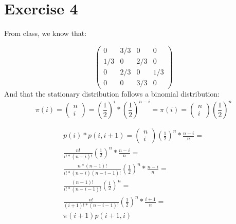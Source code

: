 \documentclass{article}\usepackage[]{graphicx}\usepackage[]{color}
\begin{document}
\section*{Exercise 4}
From class, we know that:

\begin{equation}
\left(\begin{array}{cccc}
0 & 3/3 & 0 & 0\\
1/3 & 0 & 2/3 & 0\\
0 & 2/3 & 0 & 1/3\\
0 & 0 & 3/3 & 0
\end{array}\right)
\end{equation}
And that the stationary distribution follows a binomial distribution:
\begin{equation}
\pi(i) = \left(\begin{array}{c}
n\\
i
\end{array}\right)
 = (\frac{1}{2})^{i}*(\frac{1}{2})^{n-i}= \pi(i) = \left(\begin{array}{c}
n\\
i
\end{array}\right)
(\frac{1}{2})^{n}
\end{equation}

\begin{equation}
\begin{split}
p(i)*p(i,i+1)=\left(\begin{array}{c}
n\\
i
\end{array}\right)
(\frac{1}{2})^{n}*\frac{n-i}{n} = \\
\frac{n!}{i!*(n-i)!} (\frac{1}{2})^{n}*\frac{n-i}{n} = \\
\frac{n*(n-1)!}{i!*(n-i)(n-i-1)!} (\frac{1}{2})^{n}*\frac{n-i}{n} = \\
\frac{(n-1)!}{i!*(n-i-1)!} (\frac{1}{2})^{n} = \\
\frac{n!}{(i+1)!*(n-i-1)!} (\frac{1}{2})^{n}*\frac{i+1}{n} = \\
\pi(i+1)p(i+1,i)
\end{split}
\end{equation}
\end{document}
